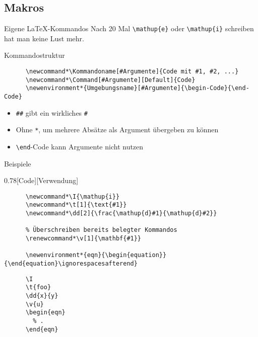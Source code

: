 \subsection{Makros}

\begin{frame}[fragile]{Eigene \LaTeX-Kommandos}
  Nach 20 Mal \lstinline+\mathup{e}+ oder \lstinline+\mathup{i}+ schreiben hat man keine Lust mehr.
  \vspace{1em}
  \begin{block}{Kommandostruktur}
    \begin{lstlisting}
      \newcommand*\Kommandoname[#Argumente]{Code mit #1, #2, ...}
      \newcommand*\Command[#Argumente][Default]{Code}
      \newenvironment*{Umgebungsname}[#Argumente]{\begin-Code}{\end-Code}
    \end{lstlisting}
  \end{block}
  \begin{itemize}
    \item \verb+##+ gibt ein wirkliches \verb+#+
    \item Ohne \texttt{*}, um mehrere Absätze als Argument übergeben zu können
    \item \lstinline+\end+-Code kann Argumente nicht nutzen
  \end{itemize}
\end{frame}

\begin{frame}[fragile]{Beispiele}
  \begin{CodeExample}{0.78}[Code][Verwendung]
    \begin{lstlisting}
      \newcommand*\I{\mathup{i}}
      \newcommand*\t[1]{\text{#1}}
      \newcommand*\dd[2]{\frac{\mathup{d}#1}{\mathup{d}#2}}

      % Überschreiben bereits belegter Kommandos
      \renewcommand*\v[1]{\mathbf{#1}}

      \newenvironment*{eqn}{\begin{equation}}{\end{equation}\ignorespacesafterend}
    \end{lstlisting}
  \CodeResult
    \begin{lstlisting}
      \I
      \t{foo}
      \dd{x}{y}
      \v{u}
      \begin{eqn}
        % .
      \end{eqn}
    \end{lstlisting}
  \end{CodeExample}
\end{frame}

